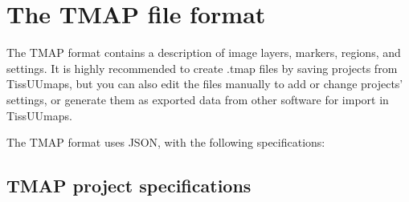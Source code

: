 \documentclass[letterpaper,10pt,english,openany,oneside]{sphinxmanual}
\begin{document}
\section{The TMAP file format}
\label{\detokenize{docs/advanced/tmap:the-tmap-file-format}}\label{\detokenize{docs/advanced/tmap::doc}}
\sphinxAtStartPar
The TMAP format contains a description of image layers, markers, regions, and settings. It is highly recommended to create .tmap files by saving projects from TissUUmaps, but you can also edit the files manually to add or change projects’ settings, or generate them as exported data from other software for import in TissUUmaps.

\sphinxAtStartPar
The TMAP format uses JSON, with the following specifications:


\subsection{TMAP project specifications}
\label{\detokenize{docs/advanced/tmap:tmap-project-specifications}}\label{\detokenize{docs/advanced/tmap:tmap-project-specifications}}
\end{document}
